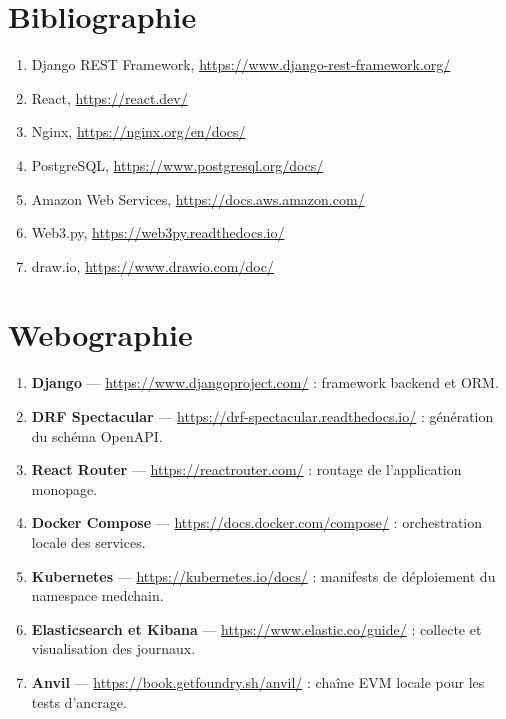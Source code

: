 \documentclass[11pt,openany]{memoir}
\begin{document}







\printglossaries

\chapter*{Bibliographie}
\begin{enumerate}
\item Django REST Framework, \url{https://www.django-rest-framework.org/}
\item React, \url{https://react.dev/}
\item Nginx, \url{https://nginx.org/en/docs/}
\item PostgreSQL, \url{https://www.postgresql.org/docs/}
\item Amazon Web Services, \url{https://docs.aws.amazon.com/}
\item Web3.py, \url{https://web3py.readthedocs.io/}
\item draw.io, \url{https://www.drawio.com/doc/}
\end{enumerate}

\chapter*{Webographie}
\begin{enumerate}
\item \textbf{Django} --- \url{https://www.djangoproject.com/} : framework backend et ORM.
\item \textbf{DRF Spectacular} --- \url{https://drf-spectacular.readthedocs.io/} : génération du schéma OpenAPI.
\item \textbf{React Router} --- \url{https://reactrouter.com/} : routage de l'application monopage.
\item \textbf{Docker Compose} --- \url{https://docs.docker.com/compose/} : orchestration locale des services.
\item \textbf{Kubernetes} --- \url{https://kubernetes.io/docs/} : manifests de déploiement du namespace medchain.
\item \textbf{Elasticsearch et Kibana} --- \url{https://www.elastic.co/guide/} : collecte et visualisation des journaux.
\item \textbf{Anvil} --- \url{https://book.getfoundry.sh/anvil/} : chaîne EVM locale pour les tests d'ancrage.
\end{enumerate}
\end{document}
